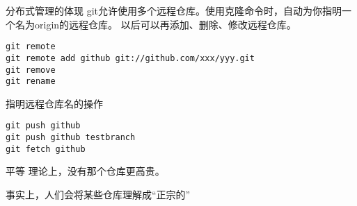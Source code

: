 \begin{frame}[<+->][fragile]{分布式管理的体现}
\onslide<+->
git允许使用多个远程仓库。使用克隆命令时，自动为你指明一个名为origin的远程仓库。
以后可以再添加、删除、修改远程仓库。
\begin{Verbatim}[frame=single,commandchars=\\\{\}]
git remote 
git remote add github git://github.com/xxx/yyy.git
git remove
git rename
\end{Verbatim}

\onslide<+->
指明远程仓库名的操作
\begin{Verbatim}[frame=single,commandchars=\\\{\}]
git push github
git push github testbranch
git fetch github
\end{Verbatim}
\end{frame}

\begin{frame}[<+->][fragile]{平等}
\onslide<+->
理论上，没有那个仓库更高贵。

\onslide<+->
事实上，人们会将某些仓库理解成“正宗的”
\end{frame}
